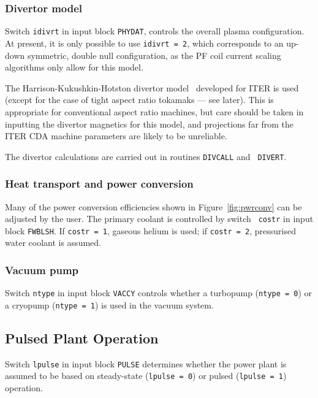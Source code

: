 
\subsubsection{Divertor model}
\label{sec:divmod}

Switch {\tt idivrt} in input block {\tt PHYDAT}, controls the overall plasma
configuration. At present, it is only possible to use {\tt idivrt = 2}, which
corresponds to an up-down symmetric, double null configuration, as the PF coil
current scaling algorithms only allow for this model.
\setlength{\parskip}{5mm}

The Harrison-Kukushkin-Hotston divertor model~\cite{IPDG} developed for ITER
is used (except for the case of tight aspect ratio tokamaks --- see
later). This is appropriate for conventional aspect ratio machines, but care
should be taken in inputting the divertor magnetics for this model, and
projections far from the ITER CDA machine parameters are likely to be
unreliable.

The divertor calculations are carried out in routines {\tt DIVCALL} and {\tt
DIVERT}.
\setlength{\parskip}{0mm}

\subsubsection{Heat transport and power conversion}

Many of the power conversion efficiencies shown in Figure~\ref{fig:pwrconv}
can be adjusted by the user. The primary coolant is controlled by switch {\tt
costr} in input block {\tt FWBLSH}.  If {\tt costr = 1}, gaseous helium is
used; if {\tt costr = 2}, pressurised water coolant is assumed.

\subsubsection{Vacuum pump}

Switch {\tt ntype} in input block {\tt VACCY} controls whether a turbopump
({\tt ntype = 0}) or a cryopump ({\tt ntype = 1}) is used in the vacuum
system.

\subsection{Pulsed Plant Operation}

Switch {\tt lpulse} in input block {\tt PULSE} determines whether the power
plant is assumed to be based on steady-state ({\tt lpulse = 0}) or
pulsed ({\tt lpulse = 1}) operation.
\setlength{\parskip}{5mm}


